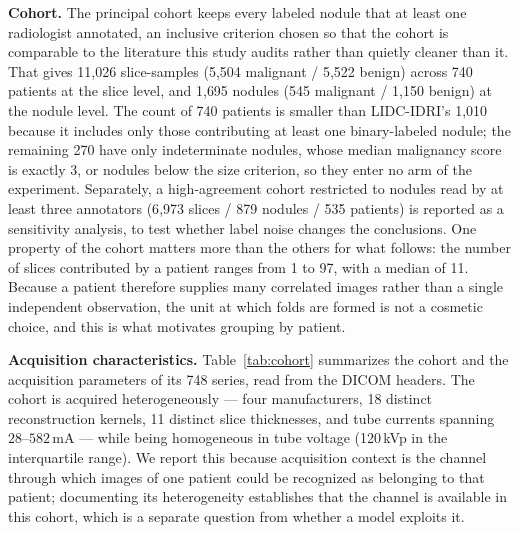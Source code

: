 \documentclass{ieeeaccess}
\begin{document}
\textbf{Cohort.} The principal cohort keeps every labeled nodule that at least one radiologist
annotated, an inclusive criterion chosen so that the cohort is comparable to the literature this
study audits rather than quietly cleaner than it. That gives 11{,}026 slice-samples (5{,}504
malignant / 5{,}522 benign) across 740 patients at the slice level, and 1{,}695 nodules (545
malignant / 1{,}150 benign) at the nodule level. The count of 740 patients is smaller than
LIDC-IDRI's 1{,}010 because it includes only those contributing at least one binary-labeled nodule;
the remaining 270 have only indeterminate nodules, whose median malignancy score is exactly 3, or
nodules below the size criterion, so they enter no arm of the experiment. Separately, a
high-agreement cohort restricted to nodules read by at least three annotators (6{,}973 slices / 879
nodules / 535 patients) is reported as a sensitivity analysis, to test whether label noise changes
the conclusions.
One property of the cohort matters more than the others for what follows: the number of slices
contributed by a patient ranges from 1 to 97, with a median of 11. Because a patient therefore
supplies many correlated images rather than a single independent observation, the unit at which folds
are formed is not a cosmetic choice, and this is what motivates grouping by patient.

\textbf{Acquisition characteristics.} Table~\ref{tab:cohort} summarizes the cohort and the
acquisition parameters of its 748 series, read from the DICOM headers. The cohort is acquired
heterogeneously --- four manufacturers, 18 distinct reconstruction kernels, 11 distinct slice
thicknesses, and tube currents spanning $28$--$582$\,mA --- while being homogeneous in tube voltage
(120\,kVp in the interquartile range). We report this because acquisition context is the channel
through which images of one patient could be recognized as belonging to that patient; documenting its
heterogeneity establishes that the channel is available in this cohort, which is a separate question
from whether a model exploits it.
\end{document}
